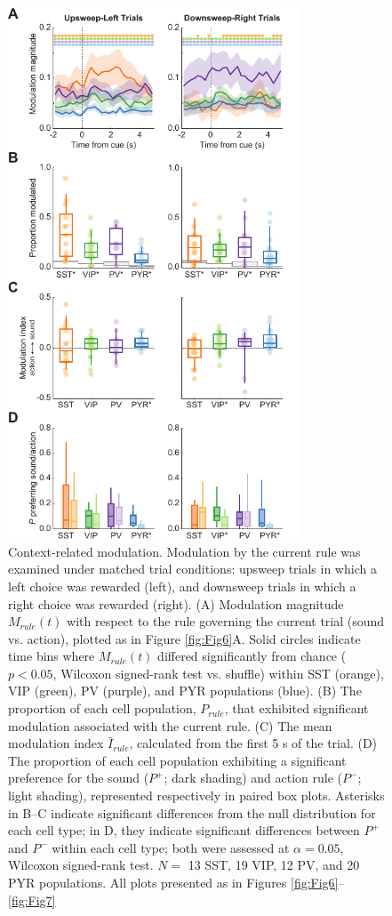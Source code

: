 \begin{figure}[htbp]

\begin{center}
\includegraphics[width=8.7cm]{Figures/Chapter4/Fig8} 
\end{center}

\caption[Context-related modulation]
{Context-related modulation. Modulation by the current rule was examined under matched trial conditions: upsweep trials in which a left choice was rewarded (left), and downsweep trials in which a right choice was rewarded (right). (A) Modulation magnitude $M_{\mathit{rule}}(t)$ with respect to the rule governing the current trial (sound vs. action), plotted as in Figure \ref{fig:Fig6}A. Solid circles indicate time bins where $M_{\mathit{rule}}(t)$ differed significantly from chance ($p<0.05$, Wilcoxon signed-rank test vs. shuffle) within SST (orange), VIP (green), PV (purple), and PYR populations (blue). (B) The proportion of each cell population, $P_{\mathit{rule}}$, that exhibited significant modulation associated with the current rule. (C) The mean modulation index $\bar{I}_{\mathit{rule}}$, calculated from the first 5 s of the trial. (D) The proportion of each cell population exhibiting a significant preference for the sound ($P^+$; dark shading) and action rule ($P^-$; light shading), represented respectively in paired box plots. Asterisks in B--C indicate significant differences from the null distribution for each cell type; in D, they indicate significant differences between $P^+$ and $P^-$ within each cell type; both were assessed at $\alpha = 0.05$, Wilcoxon signed-rank test. $N=$ 13 SST, 19 VIP, 12 PV, and 20 PYR populations. All plots presented as in Figures \ref{fig:Fig6}--\ref{fig:Fig7}}

\label{fig:Fig8}
\end{figure}

